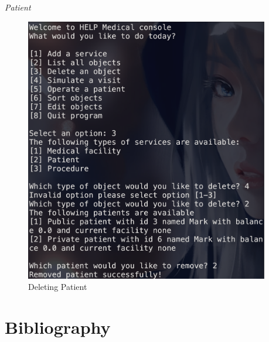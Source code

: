 \documentclass{article}
\begin{document}
	\textit{Patient}
	\begin{figure}
		\begin{center}
			\includegraphics[width=0.95\textwidth]{figures/Deleting/Deleting_Patient_01.png}
		\end{center}
		\caption{Deleting Patient}\label{fig:deleting_patient_01}
	\end{figure}
	

	

	\section{Bibliography}\label{sec:bibliography} %
	\printbibliography
\end{document}
